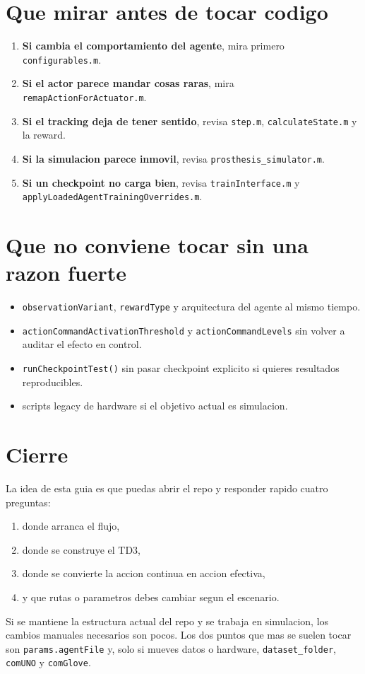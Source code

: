 \documentclass[11pt,a4paper]{article}
\begin{document}
\section{Que mirar antes de tocar codigo}

\begin{enumerate}
\item \textbf{Si cambia el comportamiento del agente}, mira primero \texttt{configurables.m}.
\item \textbf{Si el actor parece mandar cosas raras}, mira \texttt{remapActionForActuator.m}.
\item \textbf{Si el tracking deja de tener sentido}, revisa \texttt{step.m}, \texttt{calculateState.m} y la reward.
\item \textbf{Si la simulacion parece inmovil}, revisa \texttt{prosthesis\_simulator.m}.
\item \textbf{Si un checkpoint no carga bien}, revisa \texttt{trainInterface.m} y \texttt{applyLoadedAgentTrainingOverrides.m}.
\end{enumerate}

\section{Que no conviene tocar sin una razon fuerte}

\begin{itemize}
\item \texttt{observationVariant}, \texttt{rewardType} y arquitectura del agente al mismo tiempo.
\item \texttt{actionCommandActivationThreshold} y \texttt{actionCommandLevels} sin volver a auditar el efecto en control.
\item \texttt{runCheckpointTest()} sin pasar checkpoint explicito si quieres resultados reproducibles.
\item scripts legacy de hardware si el objetivo actual es simulacion.
\end{itemize}

\section{Cierre}

La idea de esta guia es que puedas abrir el repo y responder rapido cuatro preguntas:

\begin{enumerate}
\item donde arranca el flujo,
\item donde se construye el TD3,
\item donde se convierte la accion continua en accion efectiva,
\item y que rutas o parametros debes cambiar segun el escenario.
\end{enumerate}

Si se mantiene la estructura actual del repo y se trabaja en simulacion, los cambios manuales necesarios son pocos. Los dos puntos que mas se suelen tocar son \texttt{params.agentFile} y, solo si mueves datos o hardware, \texttt{dataset\_folder}, \texttt{comUNO} y \texttt{comGlove}.
\end{document}
